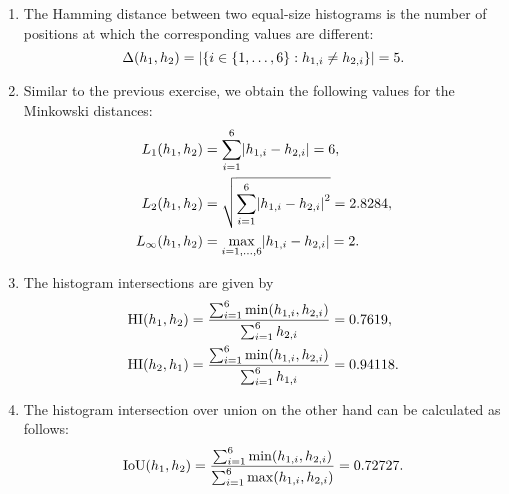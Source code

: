 \documentclass[english]{exercise}
\begin{document}
    \begin{enumerate}
        \item The Hamming distance between two equal-size histograms is the number of positions at which the corresponding values are different:
        \[
            \Delta\parentheses*{h_1, h_2} = \absolute*{\braces*{i \in \braces*{1, \ldots, 6} : h_{1, i} \ne h_{2, i}}} = 5.
        \]
        \item Similar to the previous exercise, we obtain the following values for the Minkowski distances:
        \begin{align*}
            L_1\parentheses*{h_1, h_2} &= \sum_{i = 1}^6 \absolute*{h_{1, i} - h_{2, i}} = 6,\\
            L_2\parentheses*{h_1, h_2} &= \sqrt{\sum_{i = 1}^6 \absolute*{h_{1, i} - h_{2, i}}^2} = 2.8284,\\
            L_\infty\parentheses*{h_1, h_2} &= \max_{i = 1, \ldots, 6} \absolute*{h_{1, i} - h_{2, i}} = 2.
        \end{align*}
        \item The histogram intersections are given by
        \begin{align*}
            \HI\parentheses*{h_1, h_2} &= \frac{\sum_{i = 1}^6 \min\parentheses*{h_{1, i}, h_{2, i}}}{\sum_{i = 1}^6 h_{2, i}} = 0.7619,\\
            \HI\parentheses*{h_2, h_1} &= \frac{\sum_{i = 1}^6 \min\parentheses*{h_{1, i}, h_{2, i}}}{\sum_{i = 1}^6 h_{1, i}} = 0.94118.
        \end{align*}
        \item The histogram intersection over union on the other hand can be calculated as follows:
        \[
            \IoU\parentheses*{h_1, h_2} = \frac{\sum_{i = 1}^6 \min\parentheses*{h_{1, i}, h_{2, i}}}{\sum_{i = 1}^6 \max\parentheses*{h_{1, i}, h_{2, i}}} = 0.72727.
        \]
    \end{enumerate}
\end{document}
